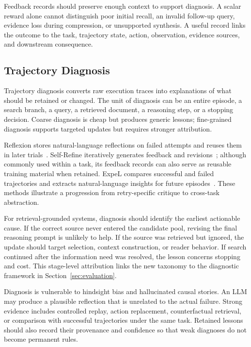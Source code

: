 Feedback records should preserve enough context to support diagnosis. A scalar reward alone cannot distinguish poor initial recall, an invalid follow-up query, evidence loss during compression, or unsupported synthesis. A useful record links the outcome to the task, trajectory state, action, observation, evidence sources, and downstream consequence.

\subsection{Trajectory Diagnosis}
\label{subsec:trajectory_diagnosis}

Trajectory diagnosis converts raw execution traces into explanations of what should be retained or changed. The unit of diagnosis can be an entire episode, a search branch, a query, a retrieved document, a reasoning step, or a stopping decision. Coarse diagnosis is cheap but produces generic lessons; fine-grained diagnosis supports targeted updates but requires stronger attribution.

Reflexion stores natural-language reflections on failed attempts and reuses them in later trials~\cite{shinn2023reflexion}. Self-Refine iteratively generates feedback and revisions~\cite{madaan2023selfrefine}; although commonly used within a task, its feedback records can also serve as reusable training material when retained. ExpeL compares successful and failed trajectories and extracts natural-language insights for future episodes~\cite{zhao2024expel}. These methods illustrate a progression from retry-specific critique to cross-task abstraction.

For retrieval-grounded systems, diagnosis should identify the earliest actionable cause. If the correct source never entered the candidate pool, revising the final reasoning prompt is unlikely to help. If the source was retrieved but ignored, the update should target selection, context construction, or reader behavior. If search continued after the information need was resolved, the lesson concerns stopping and cost. This stage-level attribution links the new taxonomy to the diagnostic framework in Section~\ref{sec:evaluation}.

Diagnosis is vulnerable to hindsight bias and hallucinated causal stories. An LLM may produce a plausible reflection that is unrelated to the actual failure. Strong evidence includes controlled replay, action replacement, counterfactual retrieval, or comparison with successful trajectories under the same task. Retained lessons should also record their provenance and confidence so that weak diagnoses do not become permanent rules.

